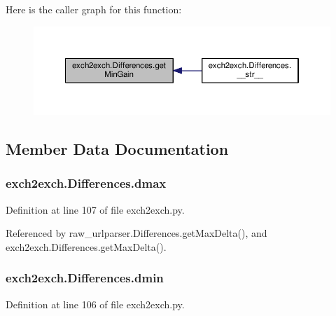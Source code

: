 Here is the caller graph for this function\-:
\nopagebreak
\begin{figure}[H]
\begin{center}
\leavevmode
\includegraphics[width=350pt]{classexch2exch_1_1_differences_a3c7fc587dedfda0e303260f244021017_icgraph}
\end{center}
\end{figure}




\subsection{Member Data Documentation}
\hypertarget{classexch2exch_1_1_differences_a261a74cc25d77b2608898fa5611f9f0b}{
\subsubsection[{dmax}]{\setlength{\rightskip}{0pt plus 5cm}exch2exch.\-Differences.\-dmax}}\label{classexch2exch_1_1_differences_a261a74cc25d77b2608898fa5611f9f0b}


Definition at line 107 of file exch2exch.\-py.



Referenced by raw\-\_\-urlparser.\-Differences.\-get\-Max\-Delta(), and exch2exch.\-Differences.\-get\-Max\-Delta().

\hypertarget{classexch2exch_1_1_differences_a7825bfca16b5775aa770c8810412b215}{
\subsubsection[{dmin}]{\setlength{\rightskip}{0pt plus 5cm}exch2exch.\-Differences.\-dmin}}\label{classexch2exch_1_1_differences_a7825bfca16b5775aa770c8810412b215}


Definition at line 106 of file exch2exch.\-py.



